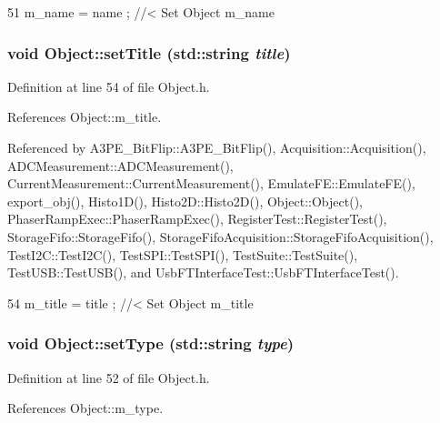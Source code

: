 \begin{DoxyCode}
51 { m_name  = name  ; } //< Set Object m_name
\end{DoxyCode}
\hypertarget{classObject_a89557dbbad5bcaa02652f5d7fa35d20f}{
\subsubsection[{setTitle}]{\setlength{\rightskip}{0pt plus 5cm}void Object::setTitle (std::string {\em title})}}
\label{classObject_a89557dbbad5bcaa02652f5d7fa35d20f}


Definition at line 54 of file Object.h.

References Object::m\_\-title.

Referenced by A3PE\_\-BitFlip::A3PE\_\-BitFlip(), Acquisition::Acquisition(), ADCMeasurement::ADCMeasurement(), CurrentMeasurement::CurrentMeasurement(), EmulateFE::EmulateFE(), export\_\-obj(), Histo1D(), Histo2D::Histo2D(), Object::Object(), PhaserRampExec::PhaserRampExec(), RegisterTest::RegisterTest(), StorageFifo::StorageFifo(), StorageFifoAcquisition::StorageFifoAcquisition(), TestI2C::TestI2C(), TestSPI::TestSPI(), TestSuite::TestSuite(), TestUSB::TestUSB(), and UsbFTInterfaceTest::UsbFTInterfaceTest().


\begin{DoxyCode}
54 { m_title = title ; } //< Set Object m_title
\end{DoxyCode}
\hypertarget{classObject_aae534cc9d982bcb9b99fd505f2e103a5}{
\subsubsection[{setType}]{\setlength{\rightskip}{0pt plus 5cm}void Object::setType (std::string {\em type})}}
\label{classObject_aae534cc9d982bcb9b99fd505f2e103a5}


Definition at line 52 of file Object.h.

References Object::m\_\-type.

